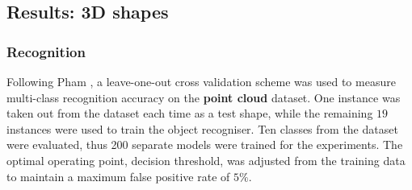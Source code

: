 \subsection{Results: 3D shapes}

\subsubsection{Recognition}
Following Pham \etal \cite{Pham2011}, a leave-one-out cross validation scheme was used to measure multi-class recognition accuracy on the \textbf{point cloud} dataset. One instance was taken out from the dataset each time as a test shape, while the remaining $19$ instances were used to train the object recogniser. Ten classes from the dataset were evaluated, thus 200 separate models were trained for the experiments. The optimal operating point, \ie decision threshold, was adjusted from the training data to maintain a maximum false positive rate of $5\%$. 

